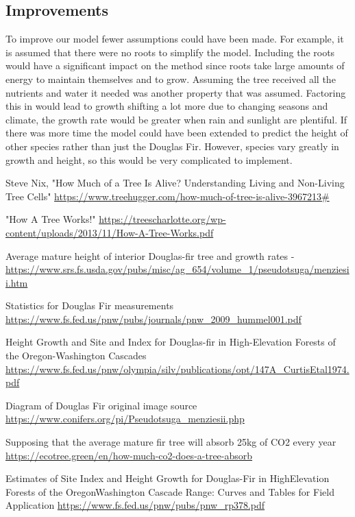 \documentclass[twocolumn]{article} %
\begin{document}
\subsection{Improvements}

To improve our model fewer assumptions could have been made. For example, it is assumed that there were no roots to simplify the model. Including the roots would have a significant impact on the method since roots take large amounts of energy to maintain themselves and to grow. Assuming the tree received all the nutrients and water it needed was another property that was assumed. Factoring this in would lead to growth shifting a lot more due to changing seasons and climate, the growth rate would be greater when rain and sunlight are plentiful. If there was more time the model could have been extended to predict the height of other species rather than just the Douglas Fir. However, species vary greatly in growth and height, so this would be very complicated to implement.






\begin{thebibliography}{99} %

Steve Nix, "How Much of a Tree Is Alive? Understanding Living and Non-Living Tree Cells"
\url{https://www.treehugger.com/how-much-of-tree-is-alive-3967213#}
 
"How A Tree Works!"
\url{https://treescharlotte.org/wp-content/uploads/2013/11/How-A-Tree-Works.pdf}

Average mature height of interior Douglas-fir tree and growth rates  - \url{https://www.srs.fs.usda.gov/pubs/misc/ag_654/volume_1/pseudotsuga/menziesii.htm}

Statistics for Douglas Fir measurements
\url{https://www.fs.fed.us/pnw/pubs/journals/pnw_2009_hummel001.pdf}

Height Growth and Site and Index for Douglas-fir in High-Elevation Forests of the Oregon-Washington Cascades
\url{https://www.fs.fed.us/pnw/olympia/silv/publications/opt/147A_CurtisEtal1974.pdf}

Diagram of Douglas Fir original image source
\url{https://www.conifers.org/pi/Pseudotsuga_menziesii.php}

Supposing that the average mature fir tree will absorb 25kg of CO2 every year
\url{https://ecotree.green/en/how-much-co2-does-a-tree-absorb}

Estimates of Site Index and Height Growth for Douglas-Fir in HighElevation Forests of the OregonWashington Cascade Range: Curves and Tables for Field Application
\url{https://www.fs.fed.us/pnw/pubs/pnw_rp378.pdf}

 
\end{thebibliography}

\end{document}
